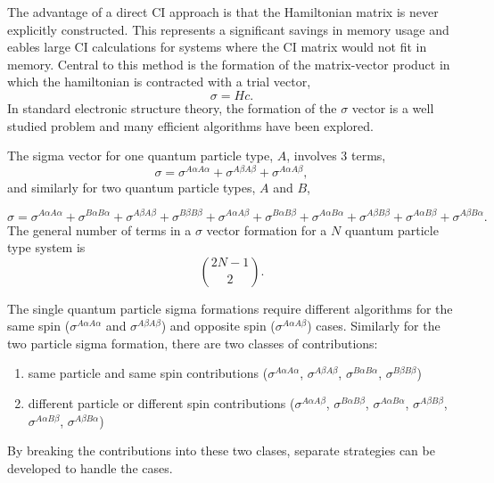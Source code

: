 The advantage of a direct CI approach is that the Hamiltonian matrix is never explicitly constructed.
This represents a significant savings in memory usage and eables large CI calculations for systems where the CI matrix would not fit in memory. Central to this method is the formation of the matrix-vector product in which the hamiltonian is contracted with a trial vector,
\begin{equation}
    \sigma = H c.
\end{equation}
In standard electronic structure theory, the formation of the $\sigma$ vector is a well studied problem and many efficient algorithms have been explored.\citehere

The sigma vector for one quantum particle type, $A$, involves 3 terms,
\begin{equation}
    \sigma = 
    \sigma^{A \alpha A \alpha} +
    \sigma^{A \beta A \beta} +
    \sigma^{A \alpha A \beta},
\end{equation}
and similarly for two quantum particle types, $A$ and $B$, 

\begin{equation}
    \sigma = 
    \sigma^{A \alpha A \alpha} +
    \sigma^{B \alpha B \alpha} +
    \sigma^{A \beta A \beta} +
    \sigma^{B \beta B \beta} +
    \sigma^{A \alpha A \beta} +
    \sigma^{B \alpha B \beta} +
    \sigma^{A \alpha B \alpha} +
    \sigma^{A \beta B \beta} +
    \sigma^{A \alpha B \beta} +
    \sigma^{A \beta B \alpha}.
\end{equation}
The general number of terms in a $\sigma$ vector formation for a $N$ quantum particle type system is 
\begin{equation}
    \binom{2N -1}{2}.
\end{equation}

The single quantum particle sigma formations require different algorithms for the same spin ($\sigma^{A\alpha A\alpha}$ and $\sigma^{A\beta A\beta}$) and opposite spin ($\sigma^{A\alpha A\beta}$) cases.
Similarly for the two particle sigma formation, there are two classes of contributions:
\begin{enumerate}
    \item same particle and same spin contributions ($\sigma^{A\alpha A\alpha}$, $\sigma^{A\beta A\beta}$, $\sigma^{B\alpha B\alpha}$, $\sigma^{B\beta B\beta}$)
    \item different particle or different spin contributions ($\sigma^{A\alpha A\beta}$, $\sigma^{B\alpha B\beta}$, $\sigma^{A\alpha B\alpha}$, $\sigma^{A\beta B\beta}$, $\sigma^{A\alpha B\beta}$, $\sigma^{A\beta B\alpha}$)
\end{enumerate}
By breaking the contributions into these two clases, separate strategies can be developed to handle the cases.

